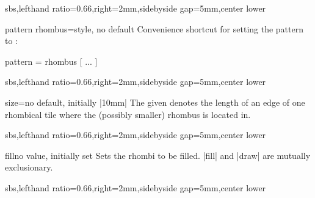 \documentclass[a4paper,11pt]{article}
\begin{document}
\begin{dispExample*}{sbs,lefthand ratio=0.66,right=2mm,sidebyside gap=5mm,center lower}
\end{dispExample*}


\begin{docTikzKey}{pattern rhombus}{=}{style, no default}
  Convenience shortcut for setting the pattern to :
\begin{dispListing}
  pattern = { rhombus [ ... ] }
\end{dispListing}
\begin{dispExample*}{sbs,lefthand ratio=0.66,right=2mm,sidebyside gap=5mm,center lower}
\end{dispExample*}
\end{docTikzKey}


\begin{docPatternKey}{size}{=}{no default, initially |10mm|}
  The given  denotes the length of an edge of one rhombical tile
  where the (possibly smaller) rhombus is located in.

\begin{dispExample*}{sbs,lefthand ratio=0.66,right=2mm,sidebyside gap=5mm,center lower}
\end{dispExample*}
\end{docPatternKey}

\clearpage

\begin{docPatternKey}{fill}{}{no value, initially set}
  Sets the rhombi to be filled. |fill| and |draw| are mutually exclusionary.
\begin{dispExample*}{sbs,lefthand ratio=0.66,right=2mm,sidebyside gap=5mm,center lower}
\end{dispExample*}
\end{docPatternKey}
\end{document}
